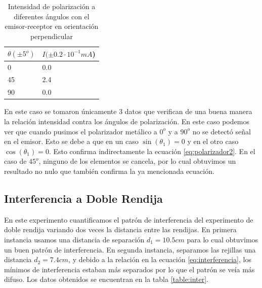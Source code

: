 \documentclass[prb,aps,twocolumn,preprintnumbers,amsmath,amssymb]{revtex4}
\begin{document}
\begin{table}[h!]
	\caption{\label{table:polarizador3}Intensidad de polarización a diferentes ángulos con  el emisor-receptor en orientación perpendicular}
	\begin{ruledtabular}
	\begin{tabular}{|M{3.5cm}|M{4.5cm}|}
		$ \theta (\pm 5^o) $ & $ I(\pm 0.2\cdot 10^{-1}mA  $)  \\ 
		  &  0.0\\
		45 &  2.4\\ 
		90 &  0.0\\ 
	\end{tabular} 
	\end{ruledtabular}
\end{table}

En este caso se tomaron únicamente 3 datos que verifican de una buena manera la relación intensidad contra los ángulos de polarización. En este caso podemos ver que cuando pusimos el polarizador metálico a $0^o$ y a $90^o$ no se detectó señal en el emisor. Esto se debe a que en un caso $\sin{(\theta_1) }= 0$ y en el otro caso $\cos{(\theta_1)} = 0$. Esto confirma indirectamente la ecuación \ref{eq:polarizador2}. En el caso de $45^o$, ninguno de los elementos se cancela, por lo cual obtuvimos un resultado no nulo que también confirma la ya mencionada ecuación.

\subsection{Interferencia a Doble Rendija}
En este experimento cuantificamos el patrón de interferencia del experimento de doble rendija variando dos veces la distancia entre las rendijas. En primera instancia usamos una distancia de separación $d_1= 10.5cm$ para lo cual obtuvimos un buen patrón de interferencia. En segunda instancia, separamos las rejillas una distancia $d_2 = 7.4cm$, y debido a la relación en la ecuación \ref{eq:interferencia}, los mínimos de interferencia estaban más separados por lo que el patrón se veía más difuso.  Los datos obtenidos se encuentran en la tabla \ref{table:inter}.
\end{document}
